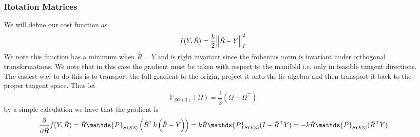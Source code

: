 \documentclass[a4paper]{article}
\begin{document}
\subsubsection*{Rotation Matrices}%
We will define our cost function as 
\[
  f(Y, \hat{R}) = \frac{k}{2}\norm{\hat{R} - Y}^2_F
\]
We note this function has a minimum when $\hat{R}= Y$ and  is right invariant since the frobenius norm is invariant under orthogonal transformations. We note that in this case the gradient must be taken with respect to the manifold i.e. only in feasible tangent directions. The easiest way to do this is to transport the full gradient to the origin, project it onto the lie algebra and then transport it back to the proper tangent space. Thus let 
\[
  \mathds{P}_{SO(3)}(\Omega) = \frac{1}{2}(\Omega - \Omega^\top)
\]
by a simple calculation we have that the gradient is
\[
  \pdv{}{\hat{R}} f(Y, \hat{R}) = \hat{R} \mathds{P}_{SO(3)} \left( \hat{R}^\top k\left(\hat{R} - Y \right) \right) = k\hat{R}\mathds{P}_{SO(3)}(I - \hat{R}^\top Y) = -k\hat{R}\mathds{P}_{SO(3)}(\hat{R}^\top Y)
\]
\end{document}
